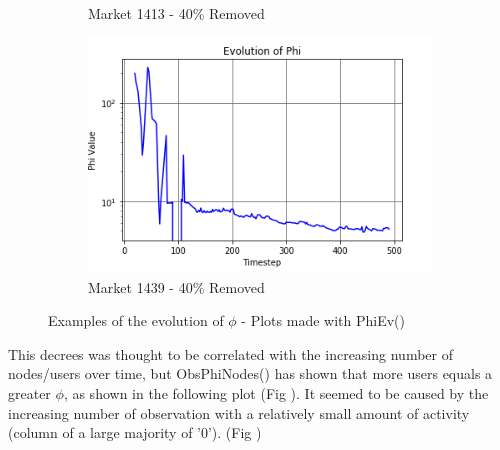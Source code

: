 \documentclass{report}
\begin{document}
\begin{figure}[ht]
\begin{subfigure}[b]{0.5\linewidth}
    \caption{Market 1413 - 40\% Removed} 
    \label{fig1:c} 
  \end{subfigure}%
  \begin{subfigure}[b]{0.5\linewidth}
    \centering
    \includegraphics[width=0.75\linewidth]{./Graphs/PhiEv-Market-1439-0.4-Removed} 
    \caption{Market 1439 - 40\% Removed} 
    \label{fig1:d} 
  \end{subfigure} 
  \caption{Examples of the evolution of $\phi $ - Plots made with PhiEv()}
  \label{fi1} 
\end{figure}

This decrees was thought to be correlated with the increasing number of nodes/users over time, but ObsPhiNodes() has shown that more users equals a greater $\phi $, as shown in the following plot (Fig ). It seemed to be caused by the increasing number of observation with a relatively small amount of activity (column of a large majority of '0'). (Fig )
\end{document}
